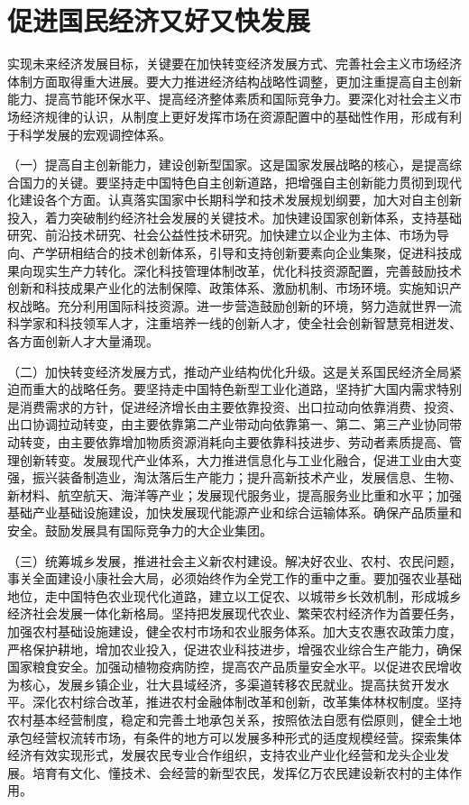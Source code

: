 \section{促进国民经济又好又快发展}

实现未来经济发展目标，关键要在加快转变经济发展方式、完善社会主义市场经济体制方面取得重大进展。要大力推进经济结构战略性调整，更加注重提高自主创新能力、提高节能环保水平、提高经济整体素质和国际竞争力。要深化对社会主义市场经济规律的认识，从制度上更好发挥市场在资源配置中的基础性作用，形成有利于科学发展的宏观调控体系。

（一）提高自主创新能力，建设创新型国家。这是国家发展战略的核心，是提高综合国力的关键。要坚持走中国特色自主创新道路，把增强自主创新能力贯彻到现代化建设各个方面。认真落实国家中长期科学和技术发展规划纲要，加大对自主创新投入，着力突破制约经济社会发展的关键技术。加快建设国家创新体系，支持基础研究、前沿技术研究、社会公益性技术研究。加快建立以企业为主体、市场为导向、产学研相结合的技术创新体系，引导和支持创新要素向企业集聚，促进科技成果向现实生产力转化。深化科技管理体制改革，优化科技资源配置，完善鼓励技术创新和科技成果产业化的法制保障、政策体系、激励机制、市场环境。实施知识产权战略。充分利用国际科技资源。进一步营造鼓励创新的环境，努力造就世界一流科学家和科技领军人才，注重培养一线的创新人才，使全社会创新智慧竞相迸发、各方面创新人才大量涌现。

（二）加快转变经济发展方式，推动产业结构优化升级。这是关系国民经济全局紧迫而重大的战略任务。要坚持走中国特色新型工业化道路，坚持扩大国内需求特别是消费需求的方针，促进经济增长由主要依靠投资、出口拉动向依靠消费、投资、出口协调拉动转变，由主要依靠第二产业带动向依靠第一、第二、第三产业协同带动转变，由主要依靠增加物质资源消耗向主要依靠科技进步、劳动者素质提高、管理创新转变。发展现代产业体系，大力推进信息化与工业化融合，促进工业由大变强，振兴装备制造业，淘汰落后生产能力；提升高新技术产业，发展信息、生物、新材料、航空航天、海洋等产业；发展现代服务业，提高服务业比重和水平；加强基础产业基础设施建设，加快发展现代能源产业和综合运输体系。确保产品质量和安全。鼓励发展具有国际竞争力的大企业集团。

（三）统筹城乡发展，推进社会主义新农村建设。解决好农业、农村、农民问题，事关全面建设小康社会大局，必须始终作为全党工作的重中之重。要加强农业基础地位，走中国特色农业现代化道路，建立以工促农、以城带乡长效机制，形成城乡经济社会发展一体化新格局。坚持把发展现代农业、繁荣农村经济作为首要任务，加强农村基础设施建设，健全农村市场和农业服务体系。加大支农惠农政策力度，严格保护耕地，增加农业投入，促进农业科技进步，增强农业综合生产能力，确保国家粮食安全。加强动植物疫病防控，提高农产品质量安全水平。以促进农民增收为核心，发展乡镇企业，壮大县域经济，多渠道转移农民就业。提高扶贫开发水平。深化农村综合改革，推进农村金融体制改革和创新，改革集体林权制度。坚持农村基本经营制度，稳定和完善土地承包关系，按照依法自愿有偿原则，健全土地承包经营权流转市场，有条件的地方可以发展多种形式的适度规模经营。探索集体经济有效实现形式，发展农民专业合作组织，支持农业产业化经营和龙头企业发展。培育有文化、懂技术、会经营的新型农民，发挥亿万农民建设新农村的主体作用。

